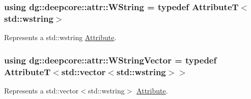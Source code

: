 \subsubsection[{\texorpdfstring{W\+String}{WString}}]{\setlength{\rightskip}{0pt plus 5cm}using {\bf dg\+::deepcore\+::attr\+::\+W\+String} = typedef AttributeT$<$std\+::wstring$>$}\hypertarget{group___process_attributes_gafbc911757b794babe4866ad9c709fa44}{}\label{group___process_attributes_gafbc911757b794babe4866ad9c709fa44}


Represents a {\ttfamily std\+::wstring} \hyperlink{classdg_1_1deepcore_1_1_attribute}{Attribute}. 

\subsubsection[{\texorpdfstring{W\+String\+Vector}{WStringVector}}]{\setlength{\rightskip}{0pt plus 5cm}using {\bf dg\+::deepcore\+::attr\+::\+W\+String\+Vector} = typedef AttributeT$<$std\+::vector$<$std\+::wstring$>$$>$}\hypertarget{group___process_attributes_gad1c4369cb66531cd432b69cbdb9ea527}{}\label{group___process_attributes_gad1c4369cb66531cd432b69cbdb9ea527}


Represents a {\ttfamily std\+::vector$<$std\+::wstring$>$} \hyperlink{classdg_1_1deepcore_1_1_attribute}{Attribute}. 

